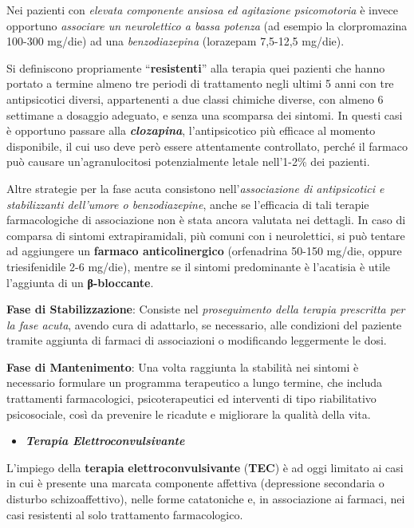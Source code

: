 \documentclass[]{article}
\begin{document}
Nei pazienti con \emph{elevata componente ansiosa ed agitazione
psicomotoria} è invece opportuno \emph{associare un neurolettico a bassa
potenza} (ad esempio la clorpromazina 100-300 mg/die) ad una
\emph{benzodiazepina} (lorazepam 7,5-12,5 mg/die).

Si definiscono propriamente ``\textbf{resistenti}'' alla terapia quei
pazienti che hanno portato a termine almeno tre periodi di trattamento
negli ultimi 5 anni con tre antipsicotici diversi, appartenenti a due
classi chimiche diverse, con almeno 6 settimane a dosaggio adeguato, e
senza una scomparsa dei sintomi. In questi casi è opportuno passare alla
\textbf{\emph{clozapina}}, l'antipsicotico più efficace al momento
disponibile, il cui uso deve però essere attentamente controllato,
perché il farmaco può causare un'agranulocitosi potenzialmente letale
nell'1-2\% dei pazienti.

Altre strategie per la fase acuta consistono nell'\emph{associazione di
antipsicotici e stabilizzanti dell'umore o benzodiazepine}, anche se
l'efficacia di tali terapie farmacologiche di associazione non è stata
ancora valutata nei dettagli. In caso di comparsa di sintomi
extrapiramidali, più comuni con i neurolettici, si può tentare ad
aggiungere un \textbf{farmaco anticolinergico} (orfenadrina 50-150
mg/die, oppure triesifenidile 2-6 mg/die), mentre se il sintomi
predominante è l'acatisia è utile l'aggiunta di un \textbf{β-bloccante}.

\textbf{Fase di Stabilizzazione}: Consiste nel \emph{proseguimento della
terapia prescritta per la fase acuta}, avendo cura di adattarlo, se
necessario, alle condizioni del paziente tramite aggiunta di farmaci di
associazioni o modificando leggermente le dosi.

\textbf{Fase di Mantenimento}: Una volta raggiunta la stabilità nei
sintomi è necessario formulare un programma terapeutico a lungo termine,
che includa trattamenti farmacologici, psicoterapeutici ed interventi di
tipo riabilitativo psicosociale, così da prevenire le ricadute e
migliorare la qualità della vita.

\begin{itemize}
\item
  \textbf{\emph{Terapia Elettroconvulsivante}}
\end{itemize}

L'impiego della \textbf{terapia} \textbf{elettroconvulsivante}
(\textbf{TEC}) è ad oggi limitato ai casi in cui è presente una marcata
componente affettiva (depressione secondaria o disturbo
schizoaffettivo), nelle forme catatoniche e, in associazione ai farmaci,
nei casi resistenti al solo trattamento farmacologico.
\end{document}
